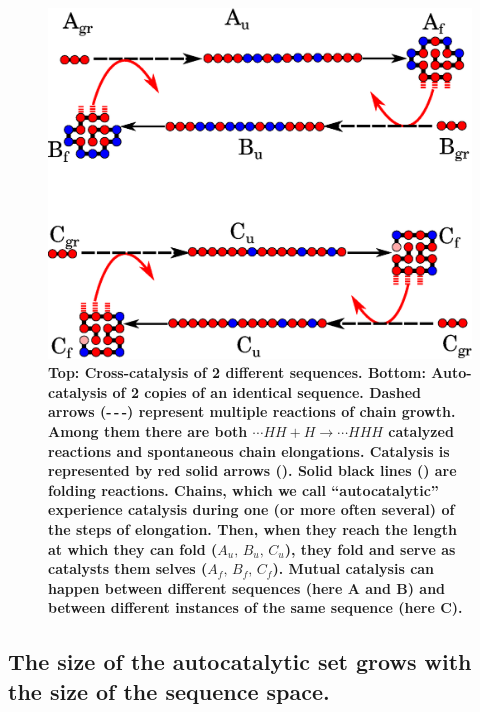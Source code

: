 \documentclass[twocolumn,letterpaper]{revtex4-1}
\newcommand*{\red}[1]{\textcolor{red}{#1}}
\begin{document}
\begin{figure}[ht!]
  \centering
  \includegraphics[width=0.9\columnwidth]{pictures/catalysis-kinEx-all.eps}
  \caption{\footnotesize{\bf{Top: Cross-catalysis of 2 different sequences.  Bottom:  
Auto-catalysis of 2 copies of an identical sequence.}  Dashed arrows (\textbf{-\,-\,-}) represent 
multiple 
reactions of chain growth. Among them there are both $\cdots HH+H\to \cdots HHH$ catalyzed 
reactions and spontaneous chain elongations. Catalysis is 
represented by red solid arrows (\red{\textbf{\textemdash}}). Solid black lines 
(\textbf{\textemdash}) are folding reactions. Chains, which we call ``autocatalytic'' experience 
catalysis during one (or more often several) of the steps of elongation. Then, when they reach the 
length at which they can fold ($A_u,\, B_u,\, C_u$), they fold and serve as catalysts them selves 
($A_f,\, B_f,\, C_f$). Mutual catalysis can happen between different sequences (here A and B) and 
between different instances of the same sequence (here C).}}
  \label{fig:kinExamples}
\end{figure}

\subsection*{The size of the autocatalytic set grows with the size of the sequence space.}
\end{document}
